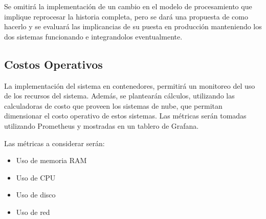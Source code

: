 Se omitirá la implementación de un cambio en el modelo de procesamiento que implique reprocesar la historia completa, 
pero se dará una propuesta de como hacerlo y se evaluará las implicancias de su puesta en producción manteniendo los dos sistemas funcionando e integrandolos eventualmente.

\subsection{Costos Operativos}

La implementación del sistema en contenedores, permitirá un monitoreo del uso de los recursos del sistema.
Además, se plantearán cálculos, utilizando las calculadoras de costo que proveen los sistemas de nube, que permitan dimensionar el costo operativo de estos sistemas.
Las métricas serán tomadas utilizando Prometheus y mostradas en un tablero de Grafana.

Las métricas a considerar serán:
\begin{itemize}
    \item Uso de memoria RAM
    \item Uso de CPU
    \item Uso de disco
    \item Uso de red
\end{itemize}

\newpage